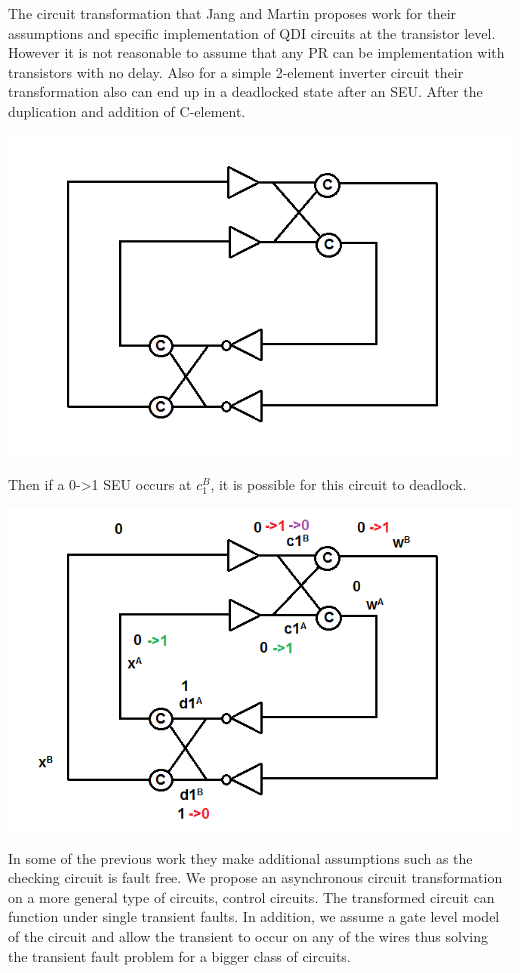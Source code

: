 \documentclass[12pt]{report}
\begin{document}
The circuit transformation that Jang and Martin proposes work for their assumptions and specific implementation of QDI circuits at the transistor level.  However it is not reasonable to assume that any PR can be implementation with transistors with no delay.  Also for a simple 2-element inverter circuit their transformation also can end up in a deadlocked state after an SEU.  After the duplication and addition of C-element.  
\begin{center}
\includegraphics[width=.7\textwidth]{transfex}
\end{center}
Then if a 0->1 SEU occurs at $c_1^B$, it is possible for this circuit to deadlock.
\begin{center}
\includegraphics[width=.7\textwidth]{transfexc}
\end{center}

In some of the previous work they make additional assumptions such as the checking circuit is fault free.  We propose an asynchronous circuit transformation on a more general type of circuits, control circuits.  The transformed circuit can function under single transient faults.  In addition, we assume a gate level model of the circuit and allow the transient to occur on any of the wires thus solving the transient fault problem for a bigger class of circuits.
\end{document}
